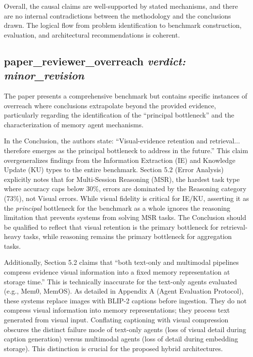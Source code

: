 \documentclass{llmxive}
\begin{document}
Overall, the causal claims are well-supported by stated mechanisms, and there are no internal contradictions between the methodology and the conclusions drawn. The logical flow from problem identification to benchmark construction, evaluation, and architectural recommendations is coherent.

\bigskip

\subsection*{paper\_reviewer\_overreach \hfill \textit{verdict: minor\_revision}}
The paper presents a comprehensive benchmark but contains specific instances of overreach where conclusions extrapolate beyond the provided evidence, particularly regarding the identification of the ``principal bottleneck'' and the characterization of memory agent mechanisms.

In the Conclusion, the authors state: ``Visual-evidence retention and retrieval... therefore emerges as the principal bottleneck to address in the future.'' This claim overgeneralizes findings from the Information Extraction (IE) and Knowledge Update (KU) types to the entire benchmark. Section 5.2 (Error Analysis) explicitly notes that for Multi-Session Reasoning (MSR), the hardest task type where accuracy caps below 30\%, errors are dominated by the Reasoning category (73\%), not Visual errors. While visual fidelity is critical for IE/KU, asserting it as the \textit{principal} bottleneck for the benchmark as a whole ignores the reasoning limitation that prevents systems from solving MSR tasks. The Conclusion should be qualified to reflect that visual retention is the primary bottleneck for retrieval-heavy tasks, while reasoning remains the primary bottleneck for aggregation tasks.

Additionally, Section 5.2 claims that ``both text-only and multimodal pipelines compress evidence visual information into a fixed memory representation at storage time.'' This is technically inaccurate for the text-only agents evaluated (e.g., Mem0, MemOS). As detailed in Appendix A (Agent Evaluation Protocol), these systems replace images with BLIP-2 captions before ingestion. They do not compress visual information into memory representations; they process text generated from visual input. Conflating captioning with visual compression obscures the distinct failure mode of text-only agents (loss of visual detail during caption generation) versus multimodal agents (loss of detail during embedding storage). This distinction is crucial for the proposed hybrid architectures.
\end{document}
